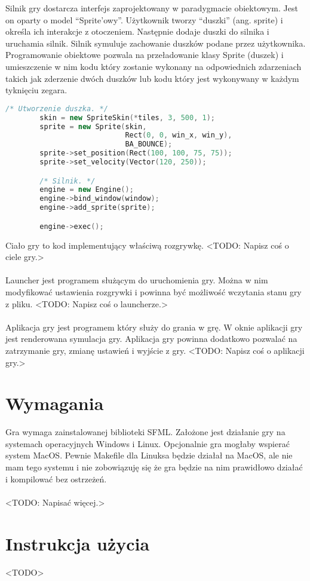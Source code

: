 \documentclass[12pt, titlepage]{article}
\begin{document}
\noindent
Silnik gry dostarcza interfejs zaprojektowany w
paradygmacie obiektowym. Jest on oparty o model
"`Sprite'owy"'. Użytkownik tworzy "`duszki"' (ang.
sprite) i określa ich interakcje z otoczeniem.
Następnie dodaje duszki do silnika i uruchamia
silnik. Silnik symuluje zachowanie duszków
podane przez użytkownika. Programowanie obiektowe
pozwala na przeładowanie klasy Sprite (duszek) i
umieszczenie w nim kodu który zostanie wykonany na
odpowiednich zdarzeniach takich jak zderzenie dwóch
duszków lub kodu który jest wykonywany w każdym
tyknięciu zegara.

\begin{lstlisting}[language=C++, caption=Interfejs silnika - kod poglądowy]
        /* Utworzenie duszka. */
        skin = new SpriteSkin(*tiles, 3, 500, 1);
        sprite = new Sprite(skin,
                            Rect(0, 0, win_x, win_y),
                            BA_BOUNCE);
        sprite->set_position(Rect(100, 100, 75, 75));
        sprite->set_velocity(Vector(120, 250));

        /* Silnik. */
        engine = new Engine();
        engine->bind_window(window);
        engine->add_sprite(sprite);

        engine->exec();
\end{lstlisting}

\noindent
Ciało gry to kod implementujący właściwą
rozgrywkę. <TODO: Napisz coś o ciele gry.>
\\~\\
Launcher jest programem służącym do
uruchomienia gry. Można w nim modyfikować
ustawienia rozgrywki i powinna być możliwość
wczytania stanu gry z pliku. <TODO: Napisz coś
o launcherze.>
\\~\\
Aplikacja gry jest programem który służy
do grania w grę. W oknie aplikacji gry jest
renderowana symulacja gry. Aplikacja gry
powinna dodatkowo pozwalać na zatrzymanie
gry, zmianę ustawień i wyjście z gry. <TODO:
Napisz coś o aplikacji gry.>

\section{Wymagania}
Gra wymaga zainstalowanej biblioteki
SFML. Założone jest działanie gry
na systemach operacyjnych Windows i
Linux. Opcjonalnie gra mogłaby wspierać
system MacOS. Pewnie Makefile dla Linuksa
będzie działał na MacOS, ale nie mam tego
systemu i nie zobowiązuję się że gra będzie
na nim prawidłowo działać i kompilować
bez ostrzeżeń.
\\~\\
<TODO: Napisać więcej.>

\section{Instrukcja użycia}
<TODO>
\end{document}

